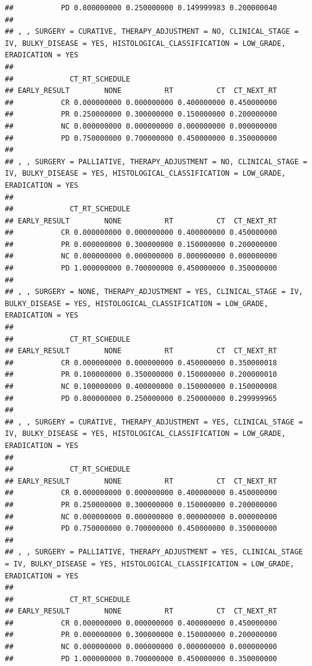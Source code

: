 \documentclass[]{article}
\begin{document}
\begin{verbatim}
##           PD 0.800000000 0.250000000 0.149999983 0.200000040
## 
## , , SURGERY = CURATIVE, THERAPY_ADJUSTMENT = NO, CLINICAL_STAGE = IV, BULKY_DISEASE = YES, HISTOLOGICAL_CLASSIFICATION = LOW_GRADE, ERADICATION = YES
## 
##             CT_RT_SCHEDULE
## EARLY_RESULT        NONE          RT          CT  CT_NEXT_RT
##           CR 0.000000000 0.000000000 0.400000000 0.450000000
##           PR 0.250000000 0.300000000 0.150000000 0.200000000
##           NC 0.000000000 0.000000000 0.000000000 0.000000000
##           PD 0.750000000 0.700000000 0.450000000 0.350000000
## 
## , , SURGERY = PALLIATIVE, THERAPY_ADJUSTMENT = NO, CLINICAL_STAGE = IV, BULKY_DISEASE = YES, HISTOLOGICAL_CLASSIFICATION = LOW_GRADE, ERADICATION = YES
## 
##             CT_RT_SCHEDULE
## EARLY_RESULT        NONE          RT          CT  CT_NEXT_RT
##           CR 0.000000000 0.000000000 0.400000000 0.450000000
##           PR 0.000000000 0.300000000 0.150000000 0.200000000
##           NC 0.000000000 0.000000000 0.000000000 0.000000000
##           PD 1.000000000 0.700000000 0.450000000 0.350000000
## 
## , , SURGERY = NONE, THERAPY_ADJUSTMENT = YES, CLINICAL_STAGE = IV, BULKY_DISEASE = YES, HISTOLOGICAL_CLASSIFICATION = LOW_GRADE, ERADICATION = YES
## 
##             CT_RT_SCHEDULE
## EARLY_RESULT        NONE          RT          CT  CT_NEXT_RT
##           CR 0.000000000 0.000000000 0.450000000 0.350000018
##           PR 0.100000000 0.350000000 0.150000000 0.200000010
##           NC 0.100000000 0.400000000 0.150000000 0.150000008
##           PD 0.800000000 0.250000000 0.250000000 0.299999965
## 
## , , SURGERY = CURATIVE, THERAPY_ADJUSTMENT = YES, CLINICAL_STAGE = IV, BULKY_DISEASE = YES, HISTOLOGICAL_CLASSIFICATION = LOW_GRADE, ERADICATION = YES
## 
##             CT_RT_SCHEDULE
## EARLY_RESULT        NONE          RT          CT  CT_NEXT_RT
##           CR 0.000000000 0.000000000 0.400000000 0.450000000
##           PR 0.250000000 0.300000000 0.150000000 0.200000000
##           NC 0.000000000 0.000000000 0.000000000 0.000000000
##           PD 0.750000000 0.700000000 0.450000000 0.350000000
## 
## , , SURGERY = PALLIATIVE, THERAPY_ADJUSTMENT = YES, CLINICAL_STAGE = IV, BULKY_DISEASE = YES, HISTOLOGICAL_CLASSIFICATION = LOW_GRADE, ERADICATION = YES
## 
##             CT_RT_SCHEDULE
## EARLY_RESULT        NONE          RT          CT  CT_NEXT_RT
##           CR 0.000000000 0.000000000 0.400000000 0.450000000
##           PR 0.000000000 0.300000000 0.150000000 0.200000000
##           NC 0.000000000 0.000000000 0.000000000 0.000000000
##           PD 1.000000000 0.700000000 0.450000000 0.350000000

\end{verbatim}
\end{document}
